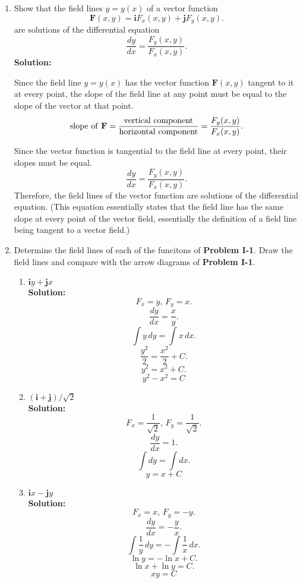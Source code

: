 \documentclass[11pt]{article}
\begin{document}
\begin{enumerate}[label= \textbf{\Alph*.}]
	\item Show that the field lines $y = y(x)$ of a vector function
		\[
			\mathbf{F}(x,y) = \mathbf{i}F_x (x,y) + \mathbf{j} F_y (x,y)
		.\] 
	are solutions of the differential equation
	\[
	\frac{dy}{dx} = \frac{F_y (x,y)}{F_x (x,y)}
	.\]
	\textbf{Solution: }

Since the field line $y=y(x)$ has the vector function $\mathbf{F}(x,y)$ tangent to it at every point, the slope of the field line at any point must be equal to the slope of the vector at that point.
\[
	\text{slope of \textbf{F}} = \frac{\text{vertical component}}{\text{horizontal component}} = \frac{F_y (x,y)}{F_x(x,y)}
.\] 

Since the vector function is tangential to the field line at every point, their slopes must be equal.
\[
\frac{dy}{dx} = \frac{F_y (x,y)}{F_x (x,y)}
.\] 
Therefore, the field lines of the vector function are solutions of the differential equation. (This equation essentially states that the field line has the same slope at every point of the vector field, essentially the definition of a field line being tangent to a vector field.)

\item Determine the field lines of each of the funcitons of \textbf{Problem I-1}. Draw the field lines and compare with the arrow diagrams of \textbf{Problem I-1}.

	\begin{enumerate}[label= \textbf{\Alph*.}]
		\item $\mathbf{i}y + \mathbf{j}x$ \\

			\textbf{Solution:}
			\[
		F_x = y, \, F_y = x
		.\] 
		\[
		\frac{dy}{dx} = \frac{x}{y}
		.\] 
		\[
		\int y \, dy = \int x \, dx
		.\] 
		\[
			\frac{y^2}{2} = \frac{x^2}{2} + C
		.\] 
		\[
			y^2 = x^2 + C	
		.\] 
		\[
			\boxed{y^2-x^2 = C}
		\] 
	\item $(\mathbf{i} + \mathbf{j}) / \sqrt{2}$ \\

		\textbf{Solution:}
		\[
		F_x = \frac{1}{\sqrt{2}}, \, F_y = \frac{1}{\sqrt{2}}
	.\] 
		\[
		\frac{dy}{dx} = 1
		.\] 
		\[
		\int dy = \int dx
		.\] 
		\[
			\boxed{y = x + C}
		\] 
	\item $\mathbf{i}x - \mathbf{j}y$\\

		\textbf{Solution:}
		 \[
		F_x = x, \, F_y = -y
		.\] 
		\[
		\frac{dy}{dx} = -\frac{y}{x}
		.\] 
		\[
		\int \frac{1}{y} \, dy = -\int \frac{1}{x} \, dx
		.\] 
		\[
			\ln y = -\ln x + C
		.\] 
		\[
		\ln x + \ln y = C
		.\] 
\[
		\boxed{xy = C}
		\] 
	

\end{enumerate}
\end{enumerate}
\end{document}
